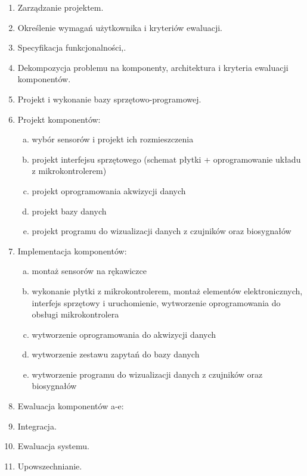 \documentclass{article}
\begin{document}
\begin{enumerate}
    \item Zarządzanie projektem.
    \item Określenie wymagań użytkownika i kryteriów ewaluacji.
    \item Specyfikacja funkcjonalności,.
    \item Dekompozycja problemu na komponenty, architektura i kryteria ewaluacji komponentów. %
    \item Projekt i wykonanie bazy sprzętowo-programowej.
    \item Projekt komponentów:
    \begin{enumerate}[a)]
        \item wybór sensorów i projekt ich rozmieszczenia
        \item projekt interfejsu sprzętowego (schemat płytki + oprogramowanie układu z mikrokontrolerem)
        \item projekt oprogramowania akwizycji danych
        \item projekt bazy danych
        \item projekt programu do wizualizacji danych z czujników oraz biosygnałów

    \end{enumerate}
        \item Implementacja komponentów:
    \begin{enumerate}[a)]
        \item montaż sensorów na rękawiczce
        \item wykonanie płytki z mikrokontrolerem, montaż elementów elektronicznych, interfejs sprzętowy i uruchomienie, wytworzenie oprogramowania do obsługi mikrokontrolera
        \item wytworzenie oprogramowania do akwizycji danych
        \item wytworzenie zestawu zapytań do bazy danych
        \item wytworzenie programu do wizualizacji danych z czujników oraz biosygnałów


    \end{enumerate}
            \item Ewaluacja komponentów a-e:
    \item Integracja.
    \item Ewaluacja systemu.
    \item Upowszechnianie.
\end{enumerate}
\end{document}
